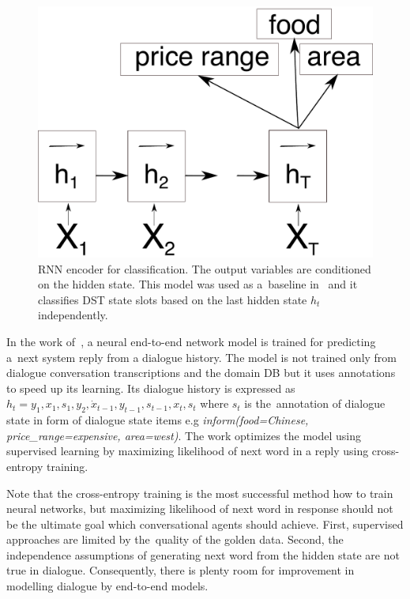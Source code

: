 \documentclass[11pt]{article}
\begin{document}
\begin{figure}[htb]
    \centering
    \includegraphics[width=0.8\linewidth]{encoder}
    \caption{RNN encoder for classification. The output variables are conditioned on the hidden state. 
    This model was used as a~baseline in~\cite{platek_recurrent_2016} and it classifies DST state slots based on the last hidden state $h_t$ independently.}
\label{fig:encoder}
\end{figure}

In the work of~\cite{wen_networkbased_2016}, a neural end-to-end network model is trained for predicting a~next system reply from a dialogue history.
The model is not trained only from dialogue conversation transcriptions and the domain DB but it uses annotations to speed up its learning.
Its dialogue history is expressed as $h_t = y_1, x_1, s_1, y_2, \dot x_{t-1}, y_{t-1}, s_{t-1}, x_t, s_t $ where $s_t$ is the~annotation of dialogue state in form of dialogue state items e.g {\it inform(food=Chinese, price\_range=expensive, area=west)}.
The work optimizes the model using supervised learning by maximizing likelihood of next word in a reply using cross-entropy training.

Note that the cross-entropy training is the most successful method how to train neural networks, but maximizing likelihood of next word in response should not be the ultimate goal which conversational agents should achieve.
First, supervised approaches are limited by the~quality of the golden data.
Second, the independence assumptions of generating next word from the hidden state are not true in dialogue.
Consequently, there is plenty room for improvement in modelling dialogue by end-to-end models.
\end{document}
